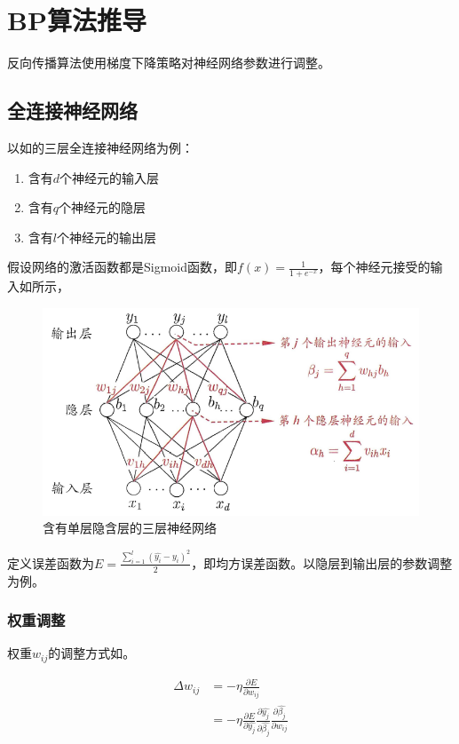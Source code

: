 
\section{BP算法推导}

反向传播算法使用梯度下降策略对神经网络参数进行调整。

\subsection{全连接神经网络}

以如的三层全连接神经网络为例：

\begin{enumerate}
\item 含有$d$个神经元的输入层
\item 含有$q$个神经元的隐层
\item 含有$l$个神经元的输出层
\end{enumerate}

假设网络的激活函数都是Sigmoid函数，即$f(x)=\frac{1}{1+e^{-x}}$，每个神经元接受的输入如所示，

\begin{figure}[tbph]
\centering
\includegraphics[width=0.75\linewidth]{.asserts/nn-module-complete}
\caption{含有单层隐含层的三层神经网络}
\label{fig:nn-module-complete}
\end{figure}

定义误差函数为$E=\frac{\sum_{i=1}^{l}{(\hat{y_i} - y_i)^2}}{2}$，即均方误差函数。以隐层到输出层的参数调整为例。

\subsubsection{权重调整}

权重$w_{ij}$的调整方式如。

\begin{equation}\label{eq:update-w}
\begin{aligned}
\Delta w_{ij} &= -\eta \frac{\partial E}{\partial w_{ij}} \\
&= -\eta \frac{\partial E}{\partial \hat{y_j}} \frac{\partial \hat{y_j}}{\partial \hat{\beta_j}} \frac{\partial \hat{\beta_j}}{\partial w_{ij}}
\end{aligned}
\end{equation}

